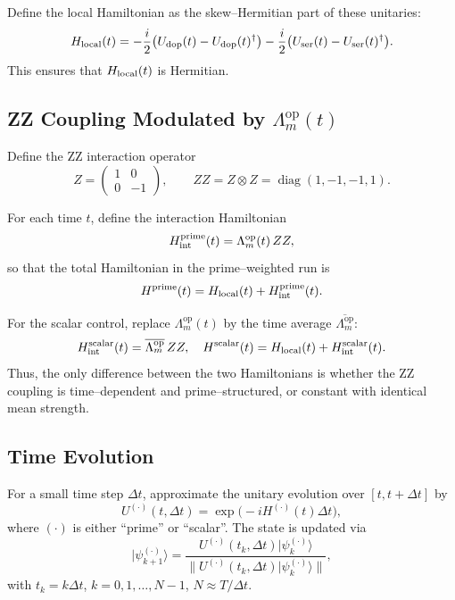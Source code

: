 \documentclass[11pt]{article}
\begin{document}
Define the local Hamiltonian as the skew–Hermitian part of these unitaries:
\begin{equation}
  H_{\rm local}(t)
  = -\frac{i}{2}\bigl(U_{\rm dop}(t) - U_{\rm dop}(t)^\dagger\bigr)
    -\frac{i}{2}\bigl(U_{\rm ser}(t) - U_{\rm ser}(t)^\dagger\bigr).
\end{equation}
This ensures that \(H_{\rm local}(t)\) is Hermitian.

\subsection{ZZ Coupling Modulated by \texorpdfstring{$\Lambda_m^{\mathrm{op}}(t)$}{Lambda\_m^{op}(t)}}

Define the ZZ interaction operator
\begin{equation}
  Z = \begin{pmatrix}1 & 0\\ 0 & -1\end{pmatrix}, \qquad
  ZZ = Z \otimes Z
  = \operatorname{diag}(1,-1,-1,1).
\end{equation}

For each time \(t\), define the interaction Hamiltonian
\begin{equation}
  H_{\rm int}^{\rm prime}(t) = \Lambda_m^{\mathrm{op}}(t) \, ZZ,
\end{equation}
so that the total Hamiltonian in the prime–weighted run is
\begin{equation}
  H^{\rm prime}(t) = H_{\rm local}(t) + H_{\rm int}^{\rm prime}(t).
\end{equation}

For the scalar control, replace \(\Lambda_m^{\mathrm{op}}(t)\) by the time average \(\overline{\Lambda_m^{\mathrm{op}}}\):
\begin{equation}
  H_{\rm int}^{\rm scalar}(t) = \overline{\Lambda_m^{\mathrm{op}}} \, ZZ,
  \quad
  H^{\rm scalar}(t) = H_{\rm local}(t) + H_{\rm int}^{\rm scalar}(t).
\end{equation}
Thus, the only difference between the two Hamiltonians is whether the ZZ coupling is time–dependent and prime–structured, or constant with identical mean strength.

\subsection{Time Evolution}

For a small time step \(\Delta t\), approximate the unitary evolution over \([t,t+\Delta t]\) by
\begin{equation}
  U^{(\cdot)}(t,\Delta t)
  = \exp\bigl(-i H^{(\cdot)}(t) \Delta t\bigr),
\end{equation}
where \((\cdot)\) is either ``prime'' or ``scalar''. The state is updated via
\begin{equation}
  |\psi_{k+1}^{(\cdot)}\rangle
  = \frac{U^{(\cdot)}(t_k,\Delta t)|\psi_k^{(\cdot)}\rangle}{\|U^{(\cdot)}(t_k,\Delta t)|\psi_k^{(\cdot)}\rangle\|},
\end{equation}
with \(t_k = k \Delta t\), \(k=0,1,\dots,N-1\), \(N \approx T/\Delta t\).
\end{document}
